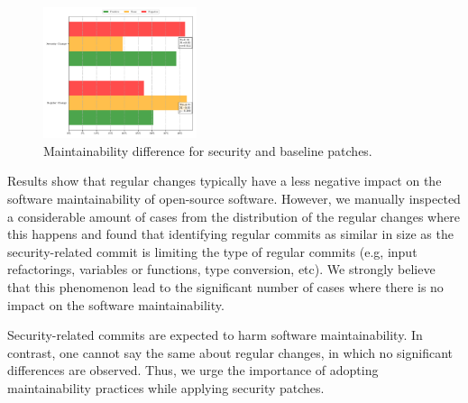 \documentclass[10pt,conference]{IEEEtran}
\begin{document}
\begin{figure}[htp]
	\vspace{-0.5cm}	
 	\centering 	
	\includegraphics[width=0.4\textwidth]{figures/main_comparison.pdf}
	\vspace{-0.3cm}
 	\caption{Maintainability difference for security and baseline patches.}
	\label{fig:secvsreg}
	\vspace{-0.4cm}
\end{figure}

Results show that regular changes typically have a less negative impact
on the software maintainability of open-source software.
However, we manually inspected a considerable amount of cases from
the distribution of the regular changes where this happens and found that 
identifying regular commits as similar in size as the security-related 
commit is limiting the type of regular commits (e.g, input 
refactorings, variables or functions, type conversion, etc).  
We strongly believe that this phenomenon lead
to the significant number of cases where there is no impact
on the software maintainability.

Security-related commits are expected to harm software maintainability. In contrast, one cannot say the same about
regular changes, in which no significant differences are observed. Thus, we
urge the importance of adopting maintainability practices while applying
security patches.
%
\end{document}
